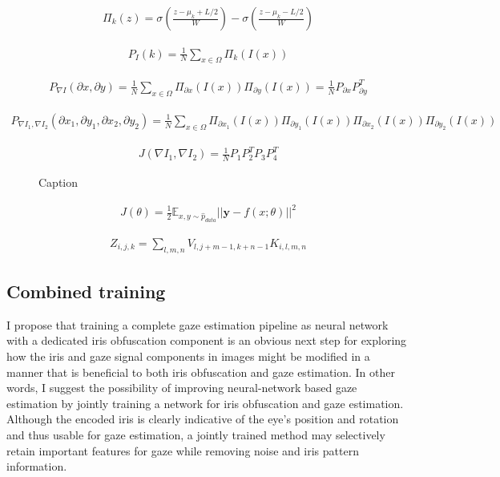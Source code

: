 \begin{align}
    \Pi_k(z) = \sigma(\frac{z-\mu_k+L/2}{W}) - \sigma(\frac{z-\mu_k-L/2}{W})
\end{align}

\begin{align}
    P_I(k) = \frac{1}{N}\sum_{x\in\Omega}\Pi_k(I(x))
\end{align}

\begin{align}
    P_{\nabla I}(\partial x, \partial y) = \frac{1}{N}\sum_{x\in\Omega}\Pi_{\partial x}(I(x))\Pi_{\partial y}(I(x)) = \frac{1}{N}P_{\partial x}P_{\partial y}^T
\end{align}

\begin{align}
    P_{\nabla I_1, \nabla I_2}(\partial x_1, \partial y_1, \partial x_2, \partial y_2) = \frac{1}{N}\sum_{x\in\Omega}\Pi_{\partial x_1}(I(x))\Pi_{\partial y_1}(I(x))\Pi_{\partial x_2}(I(x))\Pi_{\partial y_2}(I(x))
\end{align}

\begin{align}
    J(\nabla I_1, \nabla I_2) = \frac{1}{N}P_1P_2^TP_3P_4^T
\end{align}

\begin{figure}
    \centering
    \caption{Caption}
    \label{fig:my_label}
\end{figure}


\begin{align}
    J(\theta) = \frac{1}{2}\mathbb{E}_{x,y\sim \hat{p}_{data}} ||\mathbf{y}-f(x;\theta)||^2
\end{align}

\begin{align}
    Z_{i,j,k} = \sum_{l,m,n} V_{l,j+m-1, k+n-1}K_{i,l,m,n}
\end{align}



\subsection{Combined training}
I propose that training a complete gaze estimation pipeline as neural network with a dedicated iris obfuscation component is an obvious next step for exploring how the iris and gaze signal components in images might be modified in a manner that is beneficial to both iris obfuscation and gaze estimation. In other words, I suggest the possibility of improving neural-network based gaze estimation by jointly training a network for iris obfuscation and gaze estimation. Although the encoded iris is clearly indicative of the eye's position and rotation and thus usable for gaze estimation, a jointly trained method may selectively retain important features for gaze while removing noise and iris pattern information.





